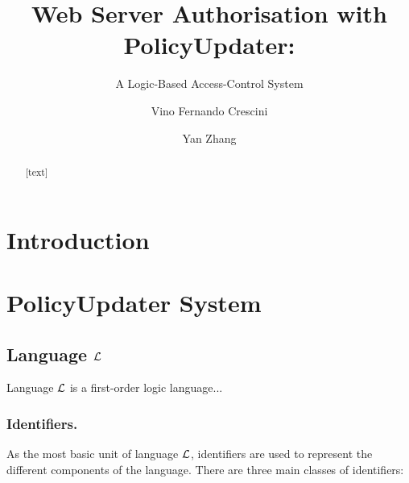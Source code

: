 \documentclass{llncs}
\begin{document}
  \title{Web Server Authorisation with PolicyUpdater:}
  \subtitle{A Logic-Based Access-Control System}

  \author{Vino Fernando Crescini \and Yan Zhang}


  \maketitle

  \begin{abstract}
    [text]
  \end{abstract}

  \section{Introduction}

  \section{PolicyUpdater System}

    \subsection{Language ${\cal L}$}

      Language ${\cal L}$ is a first-order logic language...

      \subsubsection{Identifiers.}

        As the most basic unit of language ${\cal L}$, identifiers are used to
        represent the different components of the language. There are three
        main classes of identifiers:
\end{document}

